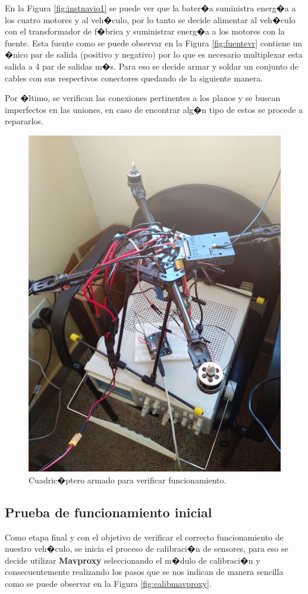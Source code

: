 		En la Figura \ref{fig:instnavio1} se puede ver que la bater�a suministra energ�a a los cuatro motores y al veh�culo, por lo tanto se decide alimentar al veh�culo con el transformador de f�brica y suministrar energ�a a  los motores con la fuente. Esta fuente como se puede observar en la Figura \ref{fig:fuentevr} contiene un �nico par de salida (positivo y negativo) por lo que es necesario multiplexar esta salida a 4 par de salidas m�s. Para eso se decide armar y soldar un conjunto de cables con sus respectivos conectores quedando de la siguiente manera.


Por �ltimo, se verifican las conexiones pertinentes a los planos y se buscan imperfectos en las uniones, en caso de encontrar alg�n tipo de estos se procede a repararlos. 
\begin{figure}[h!]
\centering
\includegraphics[width=0.5\linewidth, height=0.4\textheight]{Imagenes/fotos/quad_armado}
\caption{Cuadric�ptero armado para verificar funcionamiento.}
\label{fig:terminado}
\end{figure}


\subsection{Prueba de funcionamiento inicial}
Como etapa final y con el objetivo de verificar el correcto funcionamiento de nuestro veh�culo, se inicia el proceso de calibraci�n de sensores, para eso se decide utilizar \textbf{Mavproxy} seleccionando el m�dulo de calibraci�n y consecuentemente realizando los pasos que se nos indican de manera sencilla como se puede observar en la Figura \ref{fig:calibmavproxy}. 

